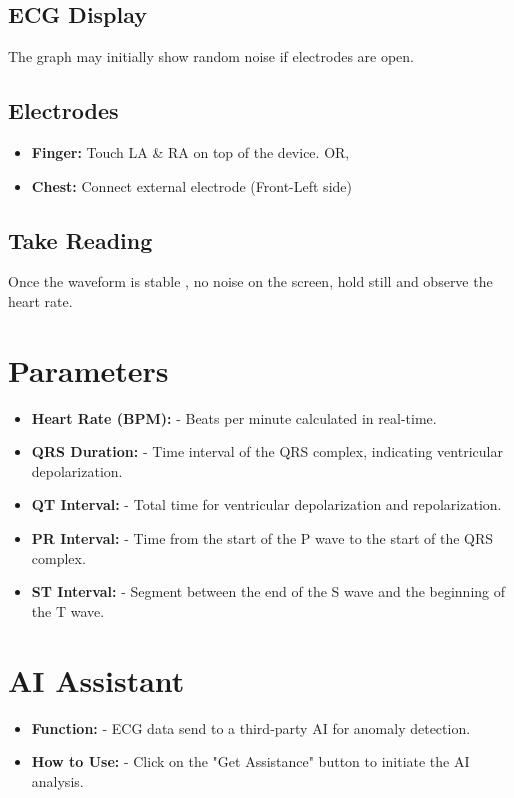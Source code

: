 \documentclass[twoside]{article}
\begin{document}
\subsection{ECG Display}
The graph may initially show random noise if electrodes are open.

\subsection{Electrodes}
\begin{itemize}[leftmargin=*]
  \item \textbf{Finger:} Touch LA \& RA on top of the device. OR,
  \item \textbf{Chest:} Connect external electrode (Front-Left side)
\end{itemize}

\subsection{Take Reading}
Once the waveform is stable , no noise on the screen, hold still and observe the heart rate.

\section{Parameters}
\begin{itemize}[leftmargin=*]
    \item \textbf{Heart Rate (BPM):} -  Beats per minute calculated in real-time.
    \item \textbf{QRS Duration:} -  Time interval of the QRS complex, indicating ventricular depolarization.
    \item \textbf{QT Interval:} -  Total time for ventricular depolarization and repolarization.
    \item \textbf{PR Interval:} -  Time from the start of the P wave to the start of the QRS complex.
    \item \textbf{ST Interval:} -  Segment between the end of the S wave and the beginning of the T wave.
\end{itemize}

\section{AI Assistant}
\begin{itemize}[leftmargin=*]
    \item \textbf{Function:} -  ECG data send to a third-party AI for anomaly detection.
    \item \textbf{How to Use:} -  Click on the "Get Assistance" button to initiate the AI analysis.
\end{itemize}
\end{document}
